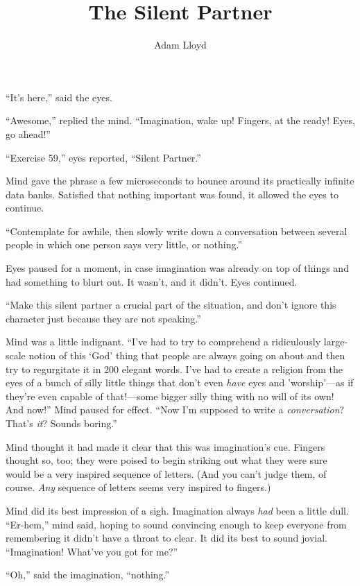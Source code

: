\documentclass[10pt]{article}
\author{Adam Lloyd}
\title{The Silent Partner}
\begin{document}
\maketitle

``It's here,'' said the eyes.

``Awesome,'' replied the mind.  ``Imagination, wake up!  Fingers, at
the ready!  Eyes, go ahead!''

``Exercise 59,'' eyes reported, ``Silent Partner.''

Mind gave the phrase a few microseconds to bounce around its practically
infinite data banks.  Satisfied that nothing important was found, it
allowed the eyes to continue.

``Contemplate for awhile, then slowly write down a conversation between
several people in which one person says very little, or nothing.''

Eyes paused for a moment, in case imagination was already on top of
things and had something to blurt out.  It wasn't, and it didn't.  Eyes
continued.

``Make this silent partner a crucial part of the situation, and don't
ignore this character just because they are not speaking.''

Mind was a little indignant.  ``I've had to try to comprehend a
ridiculously large-scale notion of this `God' thing that people are
always going on about and then try to regurgitate it in 200 elegant
words.  I've had to create a religion from the eyes of a bunch of silly
little things that don't even \emph{have} eyes and 'worship'---as if
they're even capable of that!---some bigger silly thing with no will of
its own! And now!''  Mind paused for effect.  ``Now I'm supposed to
write a \emph{conversation}?  That's \emph{it}?  Sounds boring.''

Mind thought it had made it clear that this was imagination's cue.
Fingers thought so, too; they were poised to begin striking out what
they were sure would be a very inspired sequence of letters.  (And you
can't judge them, of course.  \emph{Any} sequence of letters seems very
inspired to fingers.)

Mind did its best impression of a sigh.  Imagination always \emph{had}
been a little dull.  ``Er-hem,'' mind said, hoping to sound convincing
enough to keep everyone from remembering it didn't have a throat to
clear.  It did its best to sound jovial.  ``Imagination!  What've you
got for me?''

``Oh,'' said the imagination, ``nothing.''
\end{document}
